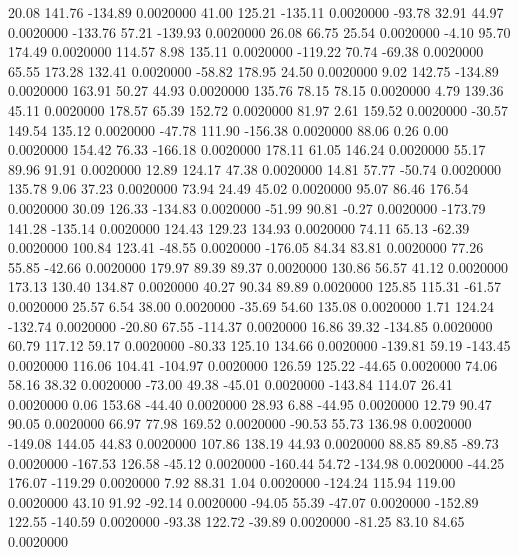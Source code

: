    20.08  141.76 -134.89   0.0020000
   41.00  125.21 -135.11   0.0020000
  -93.78   32.91   44.97   0.0020000
 -133.76   57.21 -139.93   0.0020000
   26.08   66.75   25.54   0.0020000
   -4.10   95.70  174.49   0.0020000
  114.57    8.98  135.11   0.0020000
 -119.22   70.74  -69.38   0.0020000
   65.55  173.28  132.41   0.0020000
  -58.82  178.95   24.50   0.0020000
    9.02  142.75 -134.89   0.0020000
  163.91   50.27   44.93   0.0020000
  135.76   78.15   78.15   0.0020000
    4.79  139.36   45.11   0.0020000
  178.57   65.39  152.72   0.0020000
   81.97    2.61  159.52   0.0020000
  -30.57  149.54  135.12   0.0020000
  -47.78  111.90 -156.38   0.0020000
   88.06    0.26    0.00   0.0020000
  154.42   76.33 -166.18   0.0020000
  178.11   61.05  146.24   0.0020000
   55.17   89.96   91.91   0.0020000
   12.89  124.17   47.38   0.0020000
   14.81   57.77  -50.74   0.0020000
  135.78    9.06   37.23   0.0020000
   73.94   24.49   45.02   0.0020000
   95.07   86.46  176.54   0.0020000
   30.09  126.33 -134.83   0.0020000
  -51.99   90.81   -0.27   0.0020000
 -173.79  141.28 -135.14   0.0020000
  124.43  129.23  134.93   0.0020000
   74.11   65.13  -62.39   0.0020000
  100.84  123.41  -48.55   0.0020000
 -176.05   84.34   83.81   0.0020000
   77.26   55.85  -42.66   0.0020000
  179.97   89.39   89.37   0.0020000
  130.86   56.57   41.12   0.0020000
  173.13  130.40  134.87   0.0020000
   40.27   90.34   89.89   0.0020000
  125.85  115.31  -61.57   0.0020000
   25.57    6.54   38.00   0.0020000
  -35.69   54.60  135.08   0.0020000
    1.71  124.24 -132.74   0.0020000
  -20.80   67.55 -114.37   0.0020000
   16.86   39.32 -134.85   0.0020000
   60.79  117.12   59.17   0.0020000
  -80.33  125.10  134.66   0.0020000
 -139.81   59.19 -143.45   0.0020000
  116.06  104.41 -104.97   0.0020000
  126.59  125.22  -44.65   0.0020000
   74.06   58.16   38.32   0.0020000
  -73.00   49.38  -45.01   0.0020000
 -143.84  114.07   26.41   0.0020000
    0.06  153.68  -44.40   0.0020000
   28.93    6.88  -44.95   0.0020000
   12.79   90.47   90.05   0.0020000
   66.97   77.98  169.52   0.0020000
  -90.53   55.73  136.98   0.0020000
 -149.08  144.05   44.83   0.0020000
  107.86  138.19   44.93   0.0020000
   88.85   89.85  -89.73   0.0020000
 -167.53  126.58  -45.12   0.0020000
 -160.44   54.72 -134.98   0.0020000
  -44.25  176.07 -119.29   0.0020000
    7.92   88.31    1.04   0.0020000
 -124.24  115.94  119.00   0.0020000
   43.10   91.92  -92.14   0.0020000
  -94.05   55.39  -47.07   0.0020000
 -152.89  122.55 -140.59   0.0020000
  -93.38  122.72  -39.89   0.0020000
  -81.25   83.10   84.65   0.0020000
